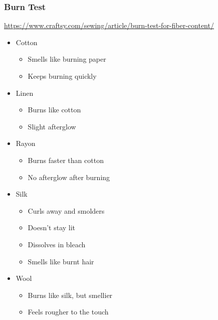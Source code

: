 \documentclass{beamer}
\begin{document}
\begin{frame}[fragile]
\frametitle{Burn Test}
\url{https://www.craftsy.com/sewing/article/burn-test-for-fiber-content/}
\begin{itemize}[<+(1)->]
\item Cotton
    \begin{itemize}
        \item Smells like burning paper
        \item Keeps burning quickly
    \end{itemize}
\item Linen
    \begin{itemize}
        \item Burns like cotton
        \item Slight afterglow
    \end{itemize}
\item Rayon
    \begin{itemize}
        \item Burns faster than cotton
        \item No afterglow after burning
    \end{itemize}
\item Silk
    \begin{itemize}
        \item Curls away and smolders
        \item Doesn't stay lit
        \item Dissolves in bleach
        \item Smells like burnt hair
    \end{itemize}
\item Wool
    \begin{itemize}
        \item Burns like silk, but smellier
        \item Feels rougher to the touch
    \end{itemize}
\end{itemize}
\end{frame}
\end{document}
